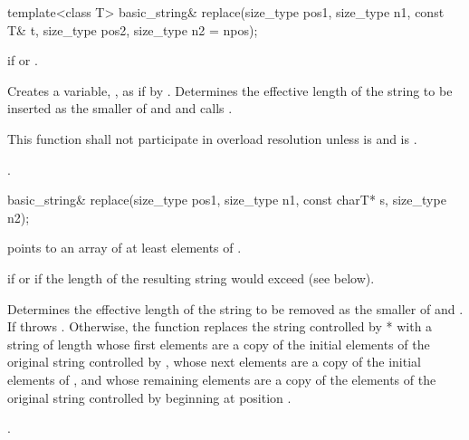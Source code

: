 %
\begin{itemdecl}
template<class T>
  basic_string& replace(size_type pos1, size_type n1, const T& t,
                        size_type pos2, size_type n2 = npos);
\end{itemdecl}

\begin{itemdescr}
\pnum
\throws
{}
if
or
.

\pnum
\effects
Creates a variable, , as if by .
Determines the effective length  of the string to be inserted
as the smaller of  and 
and calls .

\pnum
\remarks
This function shall not participate in overload resolution
unless 
is  and  is .

\pnum
\returns
{}.
\end{itemdescr}

%
\begin{itemdecl}
basic_string&
  replace(size_type pos1, size_type n1, const charT* s, size_type n2);
\end{itemdecl}

\begin{itemdescr}
\pnum
\requires {} points to an array of at
least  elements of .

\pnum
\throws {} if  or 
if the length of the resulting string would exceed  (see below).

\pnum
\effects Determines the effective length  of the string to be
removed as the smaller of  and . If
 throws . Otherwise,
the function replaces the string controlled by * with a string of
length  whose first  elements are a copy
of the initial elements of the original string controlled by ,
whose next  elements are a copy of the initial  elements
of , and whose remaining elements are a copy of the elements of the
original string controlled by  beginning at position
.

\pnum
\returns
{}.
\end{itemdescr}


